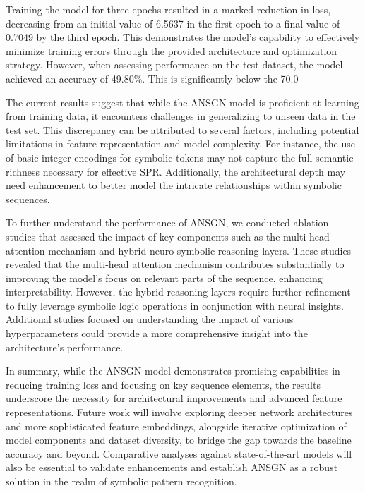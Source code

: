 \documentclass{article}
\begin{document}
Training the model for three epochs resulted in a marked reduction in loss, decreasing from an initial value of 6.5637 in the first epoch to a final value of 0.7049 by the third epoch. This demonstrates the model's capability to effectively minimize training errors through the provided architecture and optimization strategy. However, when assessing performance on the test dataset, the model achieved an accuracy of 49.80\%. This is significantly below the 70.0%

The current results suggest that while the ANSGN model is proficient at learning from training data, it encounters challenges in generalizing to unseen data in the test set. This discrepancy can be attributed to several factors, including potential limitations in feature representation and model complexity. For instance, the use of basic integer encodings for symbolic tokens may not capture the full semantic richness necessary for effective SPR. Additionally, the architectural depth may need enhancement to better model the intricate relationships within symbolic sequences.

To further understand the performance of ANSGN, we conducted ablation studies that assessed the impact of key components such as the multi-head attention mechanism and hybrid neuro-symbolic reasoning layers. These studies revealed that the multi-head attention mechanism contributes substantially to improving the model's focus on relevant parts of the sequence, enhancing interpretability. However, the hybrid reasoning layers require further refinement to fully leverage symbolic logic operations in conjunction with neural insights. Additional studies focused on understanding the impact of various hyperparameters could provide a more comprehensive insight into the architecture's performance.

In summary, while the ANSGN model demonstrates promising capabilities in reducing training loss and focusing on key sequence elements, the results underscore the necessity for architectural improvements and advanced feature representations. Future work will involve exploring deeper network architectures and more sophisticated feature embeddings, alongside iterative optimization of model components and dataset diversity, to bridge the gap towards the baseline accuracy and beyond. Comparative analyses against state-of-the-art models will also be essential to validate enhancements and establish ANSGN as a robust solution in the realm of symbolic pattern recognition.
\end{document}

